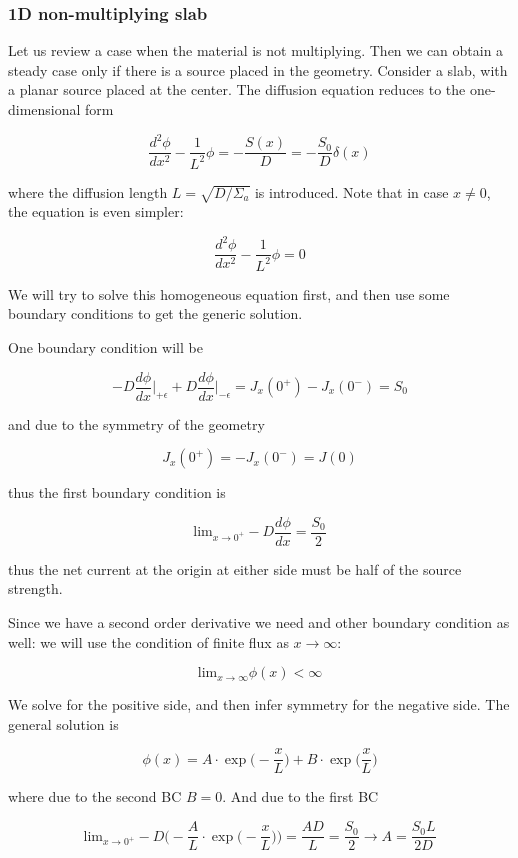 \subsubsection*{1D non-multiplying slab}

Let us review a case when the material is not multiplying. Then we can obtain a steady case only if there is a source placed in the geometry. Consider a slab, with a planar source placed at the center. The diffusion equation reduces to the one-dimensional form

$$\frac{d^2\phi}{dx^2}-\frac{1}{L^2}\phi=-\frac{S(x)}{D}=-\frac{S_0}{D}\delta(x)$$

where the diffusion length $L=\sqrt{D/\Sigma_a}$ is introduced. Note that in case $x\neq 0$, the equation is even simpler:

$$\frac{d^2\phi}{dx^2}-\frac{1}{L^2}\phi=0$$

We will try to solve this homogeneous equation first, and then use some boundary conditions to get the generic solution.

One boundary condition will be

$$-D\frac{d\phi}{dx}\rvert_{+\epsilon}+D\frac{d\phi}{dx}\rvert_{-\epsilon}=J_x(0^+)-J_x(0^-)=S_0$$

and due to the symmetry of the geometry

$$J_x(0^+)=-J_x(0^-)=J(0)$$

thus the first boundary condition is

$$\mathrm{lim}_{x\rightarrow 0^+} -D\frac{d\phi}{dx}=\frac{S_0}{2}$$

\noindent thus the net current at the origin at either side must be half of the source strength.

Since we have a second order derivative we need and other boundary condition as well: we will use the condition of finite flux as $x\rightarrow \infty$:

$$\mathrm{lim}_{x\rightarrow \infty} \phi(x) < \infty$$

We solve for the positive side, and then infer symmetry for the negative side. The general solution is

$$\phi(x)=A\cdot\exp\Big(-\frac{x}{L}\Big)+B\cdot\exp\Big(\frac{x}{L}\Big)$$

\noindent where due to the second BC $B=0$. And due to the first BC

$$\mathrm{lim}_{x\rightarrow 0^+} -D\Bigg(-\frac{A}{L}\cdot\exp\Big(-\frac{x}{L}\Big)\Bigg)=\frac{AD}{L}=\frac{S_0}{2} \rightarrow A=\frac{S_0L}{2D}$$

